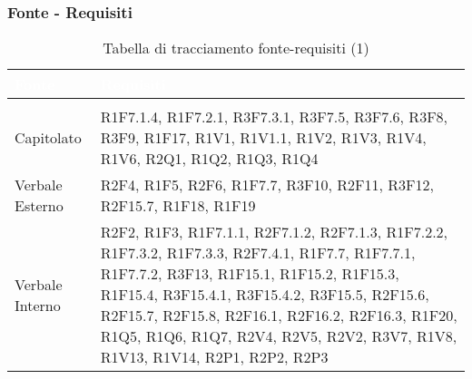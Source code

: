 \subsubsection{Fonte - Requisiti}
\renewcommand{\arraystretch}{1.5}
{
\setlength\arrayrulewidth{0.8pt}
\begin{longtable}{C{3cm} | C{12cm}}
		\textcolor{white}{\textbf{Fonte}} & 
		\textcolor{white}{\textbf{Requisiti}}\\
		\endfirsthead
	    \\
	    \endfoot
	    \caption{Tabella di tracciamento fonte-requisiti (1)}
	    \endlastfoot


Capitolato & R1F7.1.4, R1F7.2.1, R3F7.3.1, R3F7.5, R3F7.6, R3F8, R3F9, R1F17, R1V1, R1V1.1, R1V2, R1V3, R1V4, R1V6, R2Q1, R1Q2, R1Q3, R1Q4 \\

Verbale Esterno & R2F4, R1F5, R2F6, R1F7.7, R3F10, R2F11, R3F12, R2F15.7, R1F18, R1F19 \\

Verbale Interno & 	R2F2, R1F3, R1F7.1.1, R2F7.1.2, R2F7.1.3, R1F7.2.2, R1F7.3.2, R1F7.3.3, R2F7.4.1, R1F7.7, R1F7.7.1, R1F7.7.2, R3F13, R1F15.1, R1F15.2, R1F15.3, R1F15.4, R3F15.4.1, R3F15.4.2, R3F15.5, R2F15.6, R2F15.7, R2F15.8, R2F16.1, R2F16.2, R2F16.3, R1F20, R1Q5, R1Q6, R1Q7, R2V4, R2V5, R2V2, R3V7, R1V8, R1V13, R1V14, R2P1, R2P2, R2P3 \\

\end{longtable}
}

